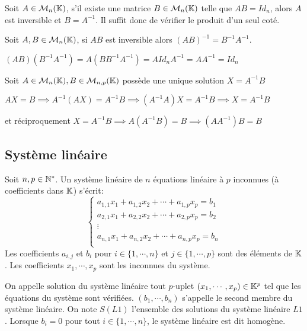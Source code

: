 \documentclass[a4paper, 12pt]{article}
\begin{document}
\begin{proposition}{}{}
    Soit $A \in \mathcal{M}_n(\mathbb{K})$, s'il existe une matrice $B \in \mathcal{M}_n(\mathbb{K})$ telle que $AB = Id_n$, alors $A$ est inversible et $B = A^{-1}$.
    Il suffit donc de vérifier le produit d'un seul coté.
\end{proposition}

\begin{proposition}{}{}
    Soit $A, B \in \mathcal{M}_n(\mathbb{K})$, si $AB$ est inversible alors $(AB)^{-1} = B^{-1}A^{-1}$.
\end{proposition}

\begin{demonstration}
    $(AB)(B^{-1}A^{-1}) = A(BB^{-1}A^{-1}) = AId_nA^{-1} = AA^{-1} = Id_n$
\end{demonstration}

\begin{proposition}{}{}
    Soit $A \in \mathcal{M}_n(\mathbb{K}), B \in \mathcal{M}_{n,p}(\mathbb{K})$ possède une unique solution $X = A^{-1}B$
\end{proposition}

\begin{demonstration}
    $AX = B \implies A^{-1}(AX) = A^{-1}B \implies (A^{-1}A)X = A^{-1}B \implies X = A^{-1}B$
    
    et réciproquement
    $X = A^{-1}B \implies A(A^{-1}B) = B \implies (AA^{-1})B = B$
\end{demonstration}

\subsection{Système linéaire}

\begin{definition}
    Soit $n, p \in \mathbb{N}^*$. Un système linéaire de $n$ équations linéaire à $p$ inconnues (à coefficients dans $\mathbb{K}$) s'écrit:
    $$
    \begin{cases}
        a_{1,1}x_1 + a_{1,2}x_2 + \cdots + a_{1,p}x_p = b_1 \\
        a_{2,1}x_1 + a_{2,2}x_2 + \cdots + a_{2,p}x_p = b_2 \\
        \vdots \\
        a_{n,1}x_1 + a_{n,2}x_2 + \cdots + a_{n,p}x_p = b_n \\
    \end{cases}
    $$
    Les coefficients $a_{i,j}$ et $b_i$ pour $i \in \{1, \cdots, n\}$ et $j \in \{1, \cdots, p\}$ sont des éléments de $\mathbb{K}$.
    Les coefficients $x_1, \cdots, x_p$ sont les inconnues du système.

    On appelle solution du système linéaire tout $p$-uplet $(x_1, \cdots, x_p) \in \mathbb{K}^p$ tel que les équations du système sont vérifiées.
    $(b_1, \cdots, b_n)$ s'appelle le second membre du système linéaire.
    On note $S(L1)$ l'ensemble des solutions du système linéaire $L1$.
    Lorsque $b_i = 0$ pour tout $i \in \{1, \cdots, n\}$, le système linéaire est dit homogène.
\end{definition}
\end{document}
